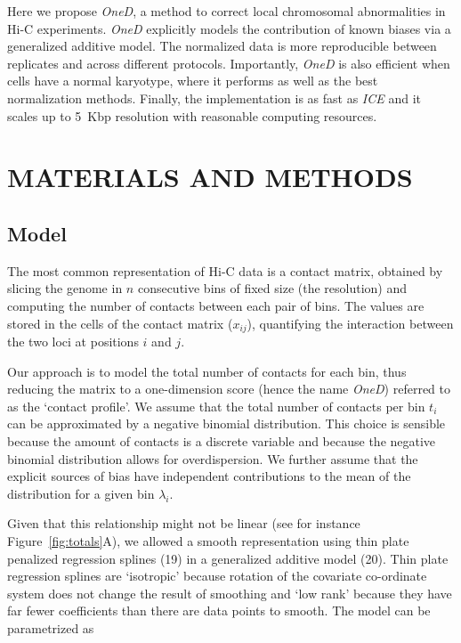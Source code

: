 \documentclass[a4,center,fleqn]{NAR}
\providecommand{\DIFadd}[1]{{\protect\color{red}#1}} %
\providecommand{\DIFdel}[1]{{\protect}}                      %
\providecommand{\DIFaddbegin}{} %
\providecommand{\DIFaddend}{} %
\providecommand{\DIFdelbegin}{} %
\providecommand{\DIFdelend}{} %
\begin{document}
Here we propose \textit{OneD}, a method to correct local chromosomal
abnormalities in Hi-C experiments. \textit{OneD} explicitly models the
contribution of known biases via a generalized additive model. The
normalized data is more reproducible between replicates and across
different protocols. Importantly, \textit{OneD} is also efficient when
cells have a normal karyotype, where it performs as well as the best
normalization methods. Finally, the implementation is as fast as
\textit{ICE} and it scales up to \DIFdelbegin \DIFdel{1~kbp }\DIFdelend \DIFaddbegin \DIFadd{5~Kbp }\DIFaddend resolution with reasonable
computing resources.


\section{MATERIALS AND METHODS}

\subsection{Model}
\DIFdelbegin %
\DIFdelend 

The most common representation of Hi-C data is a contact matrix, obtained
by slicing the genome in $n$ consecutive bins of fixed size (the
resolution) and computing the number of contacts between each pair of
bins. The values are stored in the cells of the contact matrix ($x_{ij}$),
quantifying the interaction between the two loci at positions $i$ and
$j$.

Our approach is to model the \DIFdelbegin \DIFdel{tally }\DIFdelend \DIFaddbegin \DIFadd{total number }\DIFaddend of contacts for each bin, thus
reducing the matrix to a \DIFdelbegin \DIFdel{one dimension }\DIFdelend \DIFaddbegin \DIFadd{one-dimension }\DIFaddend score (hence the name
\textit{OneD}) \DIFaddbegin \DIFadd{referred to as the `contact profile'}\DIFaddend . We assume that the
total number of contacts per bin \DIFdelbegin \DIFdel{(}\DIFdelend $t_{i}$ \DIFdelbegin \DIFdel{) }\DIFdelend can be approximated by a
negative binomial distribution. This choice is sensible because the amount
of contacts is a discrete variable and because the negative binomial
distribution allows for overdispersion. We further assume that the
explicit sources of bias have independent contributions to the mean of the
distribution for a given bin \DIFdelbegin \DIFdel{(}\DIFdelend $\lambda_i$\DIFdelbegin \DIFdel{)}\DIFdelend .

Given that this relationship might not be linear (see for instance
Figure~\ref{fig:totals}A), we allowed a smooth representation using thin
plate penalized regression splines (19) in a generalized
additive model (20). \DIFaddbegin \DIFadd{Thin plate regression splines are
`isotropic' because rotation of the covariate co-ordinate system does not
change the result of smoothing and `low rank' because they have far fewer
coefficients than there are data points to smooth. }\DIFaddend The model can be
parametrized as
\DIFdelbegin %
\end{document}
